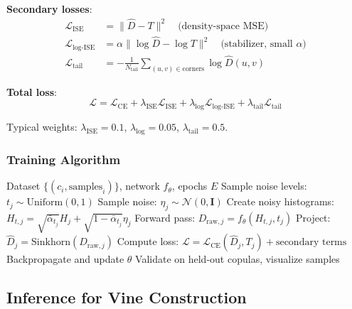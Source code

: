 \documentclass[11pt]{article}
\begin{document}
\textbf{Secondary losses}:
\begin{align}
\mathcal{L}_{\text{ISE}} &= \|\hat{D} - T\|^2 \quad \text{(density-space MSE)} \\
\mathcal{L}_{\text{log-ISE}} &= \alpha \|\log \hat{D} - \log T\|^2 \quad \text{(stabilizer, small } \alpha \text{)} \\
\mathcal{L}_{\text{tail}} &= -\frac{1}{N_{\text{tail}}} \sum_{(u,v) \in \text{corners}} \log \hat{D}(u,v)
\end{align}

\textbf{Total loss}:
\begin{equation}
\mathcal{L} = \mathcal{L}_{\text{CE}} + \lambda_{\text{ISE}} \mathcal{L}_{\text{ISE}} + \lambda_{\text{log}} \mathcal{L}_{\text{log-ISE}} + \lambda_{\text{tail}} \mathcal{L}_{\text{tail}}
\end{equation}

Typical weights: $\lambda_{\text{ISE}} = 0.1$, $\lambda_{\text{log}} = 0.05$, $\lambda_{\text{tail}} = 0.5$.

\subsubsection{Training Algorithm}

\begin{algorithm}[H]
\caption{Train Noise-Conditioned Denoiser}
\begin{algorithmic}[1]
\REQUIRE Dataset $\{(c_i, \text{samples}_i)\}$, network $f_\theta$, epochs $E$
        \STATE Sample noise levels: $t_j \sim \text{Uniform}(0, 1)$
        \STATE Sample noise: $\eta_j \sim \mathcal{N}(0, \mathbf{I})$
        \STATE Create noisy histograms: $H_{t,j} = \sqrt{\bar{\alpha}_{t_j}} H_j + \sqrt{1-\bar{\alpha}_{t_j}} \eta_j$
        \STATE Forward pass: $D_{\text{raw},j} = f_\theta(H_{t,j}, t_j)$
        \STATE Project: $\hat{D}_j = \text{Sinkhorn}(D_{\text{raw},j})$
        \STATE Compute loss: $\mathcal{L} = \mathcal{L}_{\text{CE}}(\hat{D}_j, T_j) + \text{secondary terms}$
        \STATE Backpropagate and update $\theta$
    \ENDFOR
        \STATE Validate on held-out copulas, visualize samples
    \ENDIF
\ENDFOR
\end{algorithmic}
\end{algorithm}

\subsection{Inference for Vine Construction}
\end{document}
